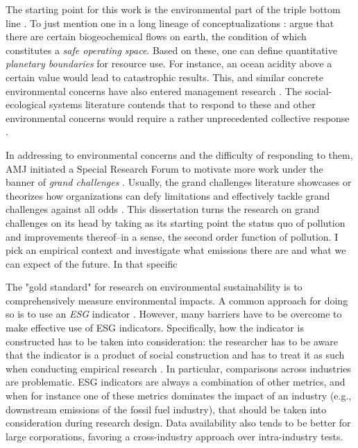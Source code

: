 The starting point for this work is the environmental part of the triple bottom line \citep{Elkington1997}. To just mention one in a long lineage of conceptualizations \citep{Bansal2017}: \citet{Rockstrom2009} argue that there are certain biogeochemical flows on earth, the condition of which constitutes a \textit{safe operating space}. Based on these, one can define quantitative \textit{planetary boundaries} for resource use. For instance, an ocean acidity above a certain value would lead to catastrophic results. This, and similar concrete environmental concerns have also entered management research \citep[e.g.,][]{Whiteman2013}. The social-ecological systems literature contends that to respond to these and other environmental concerns would require a rather unprecedented collective response \citep{Reyers2018}. 

In addressing to environmental concerns and the difficulty of responding to them, AMJ initiated a Special Research Forum to motivate more work under the banner of \textit{grand challenges} \citep{George2016}. Usually, the grand challenges literature showcases or theorizes how organizations can defy limitations and effectively tackle grand challenges against all odds \citep[e.g.,][]{Ferraro2015}. This dissertation turns the research on grand challenges on its head by taking as its starting point the status quo of pollution and improvements thereof--in a sense, the second order function of pollution. I pick an empirical context and investigate what emissions there are and what we can expect of the future. In that specific 

The "gold standard" for research on environmental sustainability is to comprehensively measure environmental impacts. A common approach for doing so is to use an \textit{ESG} indicator \citep{Montiel2014}. However, many barriers have to be overcome to make effective use of ESG indicators. Specifically, how the indicator is constructed has to be taken into consideration: the researcher has to be aware that the indicator is a product of social construction and has to treat it as such when conducting empirical research \citep{Eccles2019}. In particular, comparisons across industries are problematic. ESG indicators are always a combination of other metrics, and when for instance one of these metrics dominates the impact of an industry (e.g., downstream emissions of the fossil fuel industry), that should be taken into consideration during research design. Data availability also tends to be better for large corporations, favoring a cross-industry approach over intra-industry tests.

